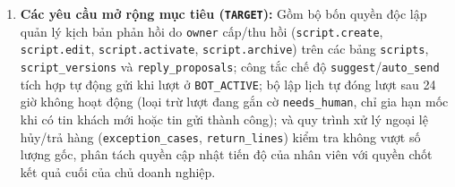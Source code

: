 \begin{enumerate}
    Song song đó, luồng tư vấn trực tiếp \texttt{POST /api/\hspace{0pt}v1/\hspace{0pt}ai/\hspace{0pt}converse} (SSE) chuyển tiếp yêu cầu (tối đa 40 lượt lịch sử, 4.000 ký tự, thân yêu cầu tối đa 256 KiB) tới điểm cuối nội bộ \texttt{/internal/\hspace{0pt}v1/\hspace{0pt}consult} của Python.
    Trước và sau khi gọi Python, lớp Go tự kiểm tra quyền thành viên hiện hành, cung cấp tối đa 100 sản phẩm đang hoạt động (tối đa 200 biến thể đã có giá), rồi \textbf{đối chiếu lại hoàn toàn} danh sách gợi ý và đơn nháp trả về theo danh mục thực tế, loại trùng lặp theo \texttt{variant\_\hspace{0pt}id} và tính lại toàn bộ đơn giá/thành tiền bằng kiểu thập phân trước khi phát các khung SSE (\texttt{message}, \texttt{products}, tùy chọn \texttt{draft\_\hspace{0pt}order}, \texttt{quick\_\hspace{0pt}replies}, \texttt{done} hoặc \texttt{error}).
  \item \textbf{Các yêu cầu mở rộng mục tiêu (\texttt{TARGET}):} Gồm bộ bốn quyền độc lập quản lý kịch bản phản hồi do \texttt{owner} cấp/thu hồi (\texttt{script.\hspace{0pt}create}, \texttt{script.\hspace{0pt}edit}, \texttt{script.\hspace{0pt}activate}, \texttt{script.\hspace{0pt}archive}) trên các bảng \texttt{scripts}, \texttt{script\_\hspace{0pt}versions} và \texttt{reply\_\hspace{0pt}proposals}; công tắc chế độ \texttt{suggest}/\texttt{auto\_\hspace{0pt}send} tích hợp tự động gửi khi lượt ở \texttt{BOT\_\hspace{0pt}ACTIVE}; bộ lập lịch tự đóng lượt sau 24 giờ không hoạt động (loại trừ lượt đang gắn cờ \texttt{needs\_\hspace{0pt}human}, chỉ gia hạn mốc khi có tin khách mới hoặc tin gửi thành công); và quy trình xử lý ngoại lệ hủy/trả hàng (\texttt{exception\_\hspace{0pt}cases}, \texttt{return\_\hspace{0pt}lines}) kiểm tra không vượt số lượng gốc, phân tách quyền cập nhật tiến độ của nhân viên với quyền chốt kết quả cuối của chủ doanh nghiệp.
\end{enumerate}

